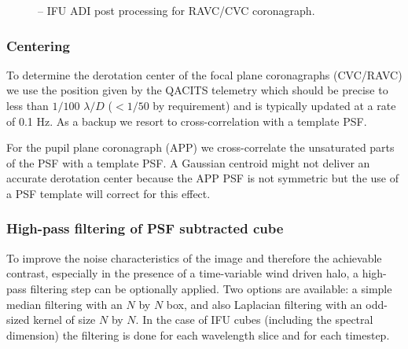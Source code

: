 \begin{figure}[hb]
  \centering
  \def \globalscale {0.400000}
  \fontsize{10}{12}\selectfont
  
  \caption[Recipe: ]{ -- IFU ADI post processing for RAVC/CVC coronagraph.
    }
  \label{fig:metis_ifu_adi_cgrph}
\end{figure}
\restoregeometry

\subsubsection{Centering}
\label{adi_center}
To determine the derotation center of the focal plane coronagraphs (CVC/RAVC) we use the position given by the QACITS telemetry which should be precise to less than $1/100$ $\lambda/D$ ($<1/50$ by requirement) and is typically updated at a rate of 0.1 Hz. As a backup we resort to cross-correlation with a template PSF.

For the pupil plane coronagraph (APP) we cross-correlate the unsaturated parts of the PSF with a template PSF. A Gaussian centroid might not deliver an accurate derotation center because the APP PSF is not symmetric but the use of a PSF template will correct for this effect.

\subsubsection{High-pass filtering of PSF subtracted cube}
\label{adi_highfilt}
To improve the noise characteristics of the image and therefore the achievable contrast, especially in the presence of a time-variable wind driven halo, a high-pass filtering step can be optionally applied. Two options are available: a simple median filtering with an $N$ by $N$ box, and also Laplacian filtering with an odd-sized kernel of size $N$ by $N$. In the case of IFU cubes (including the spectral dimension) the filtering is done for each wavelength slice and for each timestep.

